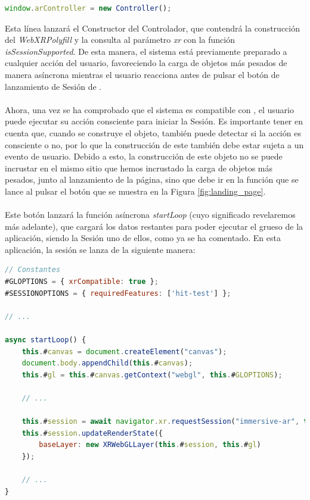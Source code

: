 \documentclass{subfiles}
\begin{document}
\begin{lstlisting}[language=JavaScript]
window.arController = new Controller();
\end{lstlisting}

        Esta línea lanzará el Constructor del Controlador, que contendrá la construcción del \textit{WebXRPolyfill} y la consulta al parámetro \textit{xr} con la función \textit{isSessionSupported}. De esta manera, el sistema está previamente preparado a cualquier acción del usuario, favoreciendo la carga de objetos más pesados de manera asíncrona mientras el usuario reacciona antes de pulsar el botón de lanzamiento de Sesión de \ra.

        \paragraph{}
        Ahora, una vez se ha comprobado que el sistema es compatible con \ra, el usuario puede ejecutar su acción consciente para iniciar la Sesión. Es importante tener en cuenta que, cuando se construye el objeto, también puede detectar si la acción es consciente o no, por lo que la construcción de este también debe estar sujeta a un evento de usuario. Debido a esto, la construcción de este objeto no se puede incrustar en el mismo sitio que hemos incrustado la carga de objetos más pesados, junto al lanzamiento de la página, sino que debe ir en la función que se lance al pulsar el botón que se muestra en la Figura \ref{fig:landing_page}.

        \paragraph{}
        Este botón lanzará la función asíncrona \textit{startLoop} (cuyo significado revelaremos más adelante), que cargará los datos restantes para poder ejecutar el grueso de la aplicación, siendo la Sesión uno de ellos, como ya se ha comentado. En esta aplicación, la sesión se lanza de la siguiente manera:

\begin{lstlisting}[language=JavaScript]
// Constantes
#GLOPTIONS = { xrCompatible: true };
#SESSIONOPTIONS = { requiredFeatures: ['hit-test'] };

// ...

async startLoop() {
    this.#canvas = document.createElement("canvas");
    document.body.appendChild(this.#canvas);
    this.#gl = this.#canvas.getContext("webgl", this.#GLOPTIONS);

    // ...
    
    this.#session = await navigator.xr.requestSession("immersive-ar", this.#SESSIONOPTIONS);
    this.#session.updateRenderState({
        baseLayer: new XRWebGLLayer(this.#session, this.#gl)
    });

    // ...
}
\end{lstlisting}
        
\end{document}
